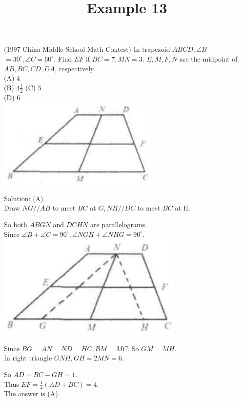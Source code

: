 \documentclass{article}
\title{Example 13}
\date{}
\begin{document}
\maketitle

(1997 China Middle School Math Contest) In trapezoid \(A B C D, \angle B\) \(=30^{\circ}, \angle C=60^{\circ}\). Find \(E F\) if \(B C=7, M N=3\). \(E, M, F, N\) are the midpoint of \(A B, B C, C D, D A\), respectively.\\
(A) 4\\
(B) \(4 \frac{1}{2}\) (C) 5\\
(D) 6\\
\centering
\includegraphics[width=\textwidth]{images/problem_image_1.jpg}

Solution: (A).\\
Draw \(N G / / A B\) to meet \(B C\) at \(G, N H / / D C\) to meet \(B C\) at H.

So both \(A B G N\) and \(D C H N\) are parallelograms.\\
Since \(\angle B+\angle C=90^{\circ}, \angle N G H+\angle N H G=90^{\circ}\).\\
\centering
\includegraphics[width=\textwidth]{images/reasoning_image_1.jpg}

Since \(B G=A N=N D=H C, B M=M C\). So \(G M=M H\).\\
In right triangle \(G N H, G H=2 M N=6\).


So \(A D=B C-G H=1\).\\
Thus \(E F=\frac{1}{2}(A D+B C)=4\).\\
The answer is (A).
\end{document}
